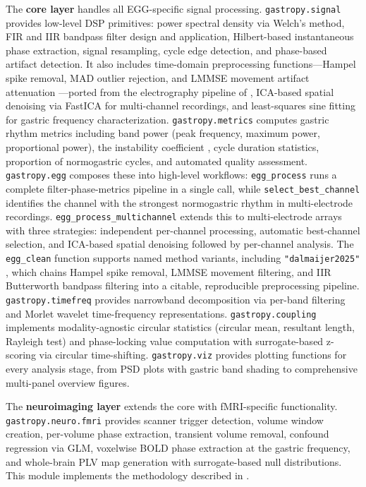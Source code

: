 \documentclass[12pt]{article}
\begin{document}
The \textbf{core layer} handles all EGG-specific signal processing.
\texttt{gastropy.signal} provides low-level DSP primitives: power spectral
density via Welch's method, FIR and IIR bandpass filter design and application,
Hilbert-based instantaneous phase extraction, signal resampling, cycle edge
detection, and phase-based artifact detection. It also includes time-domain
preprocessing functions---Hampel spike removal, MAD outlier rejection, and
LMMSE movement artifact attenuation \citep{Gharibans2018}---ported from the
electrography pipeline of \citet{Anisimova2025}, ICA-based spatial denoising
via FastICA \citep{Pedregosa2011} for multi-channel recordings, and
least-squares sine fitting for gastric frequency characterization.
\texttt{gastropy.metrics}
computes gastric rhythm metrics including band power (peak frequency, maximum
power, proportional power), the instability coefficient
\citep{Koch2004}, cycle duration statistics, proportion of normogastric
cycles, and automated quality assessment. \texttt{gastropy.egg} composes these
into high-level workflows: \texttt{egg\_process} runs a complete
filter-phase-metrics pipeline in a single call, while
\texttt{select\_best\_channel} identifies the channel with the strongest
normogastric rhythm in multi-electrode recordings.
\texttt{egg\_process\_multichannel} extends this to multi-electrode arrays with
three strategies: independent per-channel processing, automatic best-channel
selection, and ICA-based spatial denoising followed by per-channel analysis.
The \texttt{egg\_clean} function supports named method variants, including
\texttt{"dalmaijer2025"} \citep{Anisimova2025}, which chains Hampel spike
removal, LMMSE movement filtering, and IIR Butterworth bandpass filtering into
a citable, reproducible preprocessing pipeline.
\texttt{gastropy.timefreq} provides narrowband decomposition via per-band
filtering and Morlet wavelet time-frequency representations.
\texttt{gastropy.coupling} implements modality-agnostic circular statistics
(circular mean, resultant length, Rayleigh test) and phase-locking value
computation with surrogate-based z-scoring via circular time-shifting.
\texttt{gastropy.viz} provides plotting functions for every analysis stage,
from PSD plots with gastric band shading to comprehensive multi-panel overview
figures.

The \textbf{neuroimaging layer} extends the core with fMRI-specific
functionality. \texttt{gastropy.neuro.fmri} provides scanner trigger
detection, volume window creation, per-volume phase extraction, transient
volume removal, confound regression via GLM, voxelwise BOLD phase extraction
at the gastric frequency, and whole-brain PLV map generation with
surrogate-based null distributions. This module implements the methodology
described in \citet{Banellis2025}.
\end{document}
